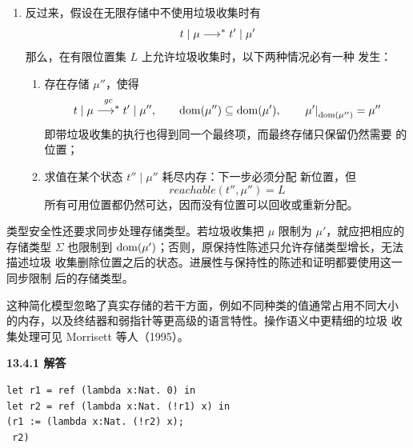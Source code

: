 \begin{taplauthorsolutionentrybox}
\begin{enumerate}
\begin{enumerate}[label=\textup{\alph*.}]
      \item 反过来，假设在无限存储中不使用垃圾收集时有
        \[
          t\mid\mu\mathrel{\longrightarrow^{*}} t'\mid\mu'
        \]
        那么，在有限位置集 \(L\) 上允许垃圾收集时，以下两种情况必有一种
        发生：
        \begin{enumerate}[label=\textup{\roman*.}]
          \item 存在存储 \(\mu''\)，使得
            \[
              t\mid\mu\overset{gc}{\mathrel{\longrightarrow^{*}}}t'\mid\mu'',
              \qquad
              \operatorname{dom}(\mu'')\subseteq\operatorname{dom}(\mu'),
              \qquad
              \left.\mu'\right|_{\operatorname{dom}(\mu'')}=\mu''
            \]
            即带垃圾收集的执行也得到同一个最终项，而最终存储只保留仍然需要
            的位置；

          \item 求值在某个状态 \(t''\mid\mu''\) 耗尽内存：下一步必须分配
            新位置，但
            \[
              \mathit{reachable}(t'',\mu'')=L
            \]
            所有可用位置都仍然可达，因而没有位置可以回收或重新分配。
        \end{enumerate}
    \end{enumerate}
\end{enumerate}


类型安全性还要求同步处理存储类型。若垃圾收集把 \(\mu\) 限制为
\(\mu'\)，就应把相应的存储类型 \(\Sigma\) 也限制到
\(\operatorname{dom}(\mu')\)；否则，原保持性陈述只允许存储类型增长，无法描述垃圾
收集删除位置之后的状态。进展性与保持性的陈述和证明都要使用这一同步限制
后的存储类型。

这种简化模型忽略了真实存储的若干方面，例如不同种类的值通常占用不同大小
的内存，以及终结器和弱指针等更高级的语言特性。操作语义中更精细的垃圾
收集处理可见 Morrisett 等人（1995）。

\end{taplauthorsolutionentrybox}

\begin{taplauthorsolutionentrybox}
\label{sol:author:13.4.1}
\textbf{13.4.1 解答}

\begin{lstlisting}
let r1 = ref (lambda x:Nat. 0) in
let r2 = ref (lambda x:Nat. (!r1) x) in
(r1 := (lambda x:Nat. (!r2) x);
 r2)
\end{lstlisting}

\end{taplauthorsolutionentrybox}

